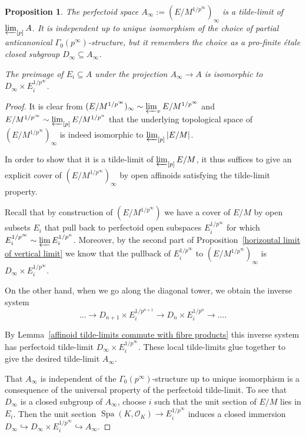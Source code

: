 \documentclass[10pt,oneside]{amsart}
\newtheorem{proposition}[theorem]{Proposition}
\theoremstyle{definition}
\begin{document}
	\begin{proposition}\label{tilde-limit of tilde-limits of partial towers is tilde-limit of whole tower}
		The perfectoid space  $A_\infty:=(E/M^{1/p^\infty})_\infty$ is a tilde-limit of $\varprojlim_{[p]}A$.	It is independent up to unique isomorphism of the choice of partial anticanonical $\Gamma_0(p^\infty)$-structure, but it remembers the choice as a pro-finite \'etale closed subgroup $D_\infty \subseteq A_\infty$. 
		
		The preimage of $E_i\subseteq A$ under the projection $A_\infty \rightarrow A$ is isomorphic to $D_\infty \times E_i^{1/p^\infty}$.
	\end{proposition}
	\begin{proof}
	It is clear from $(E/M^{1/p^\infty})_\infty \sim \varprojlim_v E/M^{1/p^\infty}$ and $E/M^{1/p^\infty}\sim \varprojlim_{[p]} E/M^{1/p^n}$ that the underlying topological space of $(E/M^{1/p^\infty})_\infty$ is indeed isomorphic to $\varprojlim_{[p]}|E/M|$.

	In order to show that it is a tilde-limit of $\varprojlim_{[p]}E/M$, it thus suffices to give an explicit cover of $(E/M^{1/p^\infty})_\infty$ by open affinoids satisfying the tilde-limit property. 
	
	Recall that by construction of $(E/M^{1/p^\infty})$ we have a cover of $E/M$ by open subsets $E_i$ that pull back to perfectoid open subspaces $E_i^{1/p^\infty}$ for which $E_i^{1/p^\infty}\sim \varprojlim E_i^{1/p^n}$.
	 Moreover, by the second part of Proposition~\ref{horizontal limit of vertical limit} we know that the pullback of $E_i^{1/p^\infty}$ to $(E/M^{1/p^\infty})_\infty$ is $D_\infty \times E_i^{1/p^\infty}$. 
	 
	 On the other hand, when we go along the diagonal tower, we obtain the inverse system 
	 \[\dots\rightarrow D_{n+1}\times E_i^{1/p^{n+1}}\rightarrow D_{n}\times E_i^{1/p^{n}}\rightarrow \dots.\]
	 
	By Lemma~\ref{affinoid tilde-limits commute with fibre products} this inverse system has perfectoid tilde-limit $D_\infty \times E_i^{1/p^\infty}$. These local tilde-limits glue together to give the desired tilde-limit $A_\infty$.
	 
	That $A_\infty$ is independent of the $\Gamma_0(p^\infty)$-structure up to unique isomorphism is a consequence of the universal property of the perfectoid tilde-limit. To see that $D_\infty$ is a closed subgroup of $A_\infty$, choose $i$ such that the unit section of $E/M$ lies in $E_i$. Then the unit section $\operatorname{Spa}(K,\mathcal O_K)\rightarrow E_i^{1/p^\infty}$ induces a closed immersion $D_\infty\hookrightarrow D_\infty \times E_i^{1/p^\infty}\hookrightarrow A_\infty$.
	\end{proof}
	
\end{document}
